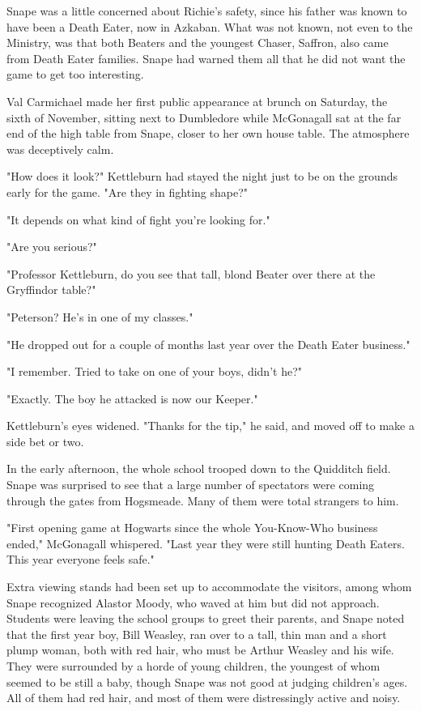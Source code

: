 Snape was a little concerned about Richie's safety, since his father was known to have been a Death Eater, now in Azkaban. What was not known, not even to the Ministry, was that both Beaters and the youngest Chaser, Saffron, also came from Death Eater families. Snape had warned them all that he did not want the game to get too interesting.

Val Carmichael made her first public appearance at brunch on Saturday, the sixth of November, sitting next to Dumbledore while McGonagall sat at the far end of the high table from Snape, closer to her own house table. The atmosphere was deceptively calm.

"How does it look?" Kettleburn had stayed the night just to be on the grounds early for the game. "Are they in fighting shape?"

"It depends on what kind of fight you're looking for."

"Are you serious?"

"Professor Kettleburn, do you see that tall, blond Beater over there at the Gryffindor table?"

"Peterson? He's in one of my classes."

"He dropped out for a couple of months last year over the Death Eater business."

"I remember. Tried to take on one of your boys, didn't he?"

"Exactly. The boy he attacked is now our Keeper."

Kettleburn's eyes widened. "Thanks for the tip," he said, and moved off to make a side bet or two.

In the early afternoon, the whole school trooped down to the Quidditch field. Snape was surprised to see that a large number of spectators were coming through the gates from Hogsmeade. Many of them were total strangers to him.

"First opening game at Hogwarts since the whole You-Know-Who business ended," McGonagall whispered. "Last year they were still hunting Death Eaters. This year everyone feels safe."

Extra viewing stands had been set up to accommodate the visitors, among whom Snape recognized Alastor Moody, who waved at him but did not approach. Students were leaving the school groups to greet their parents, and Snape noted that the first year boy, Bill Weasley, ran over to a tall, thin man and a short plump woman, both with red hair, who must be Arthur Weasley and his wife. They were surrounded by a horde of young children, the youngest of whom seemed to be still a baby, though Snape was not good at judging children's ages. All of them had red hair, and most of them were distressingly active and noisy.

